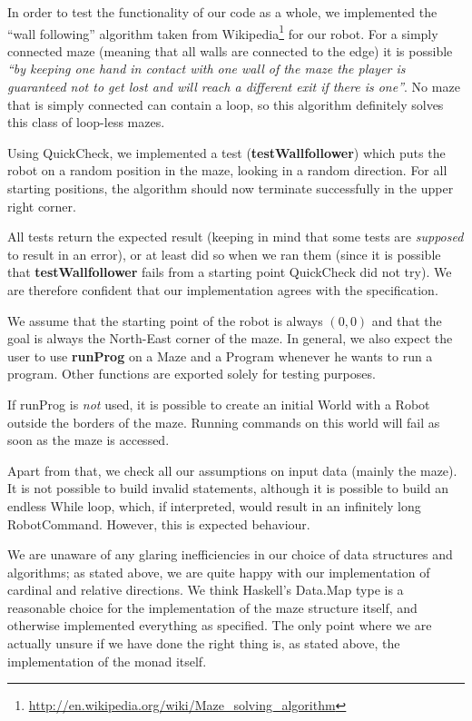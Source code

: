 \documentclass[a4paper]{article}
\begin{document}
In order to test the functionality of our code as a whole, we implemented the ``wall following'' algorithm taken from
Wikipedia\footnote{\url{http://en.wikipedia.org/wiki/Maze_solving_algorithm}} for our robot.
For a simply connected maze (meaning that all walls are
connected to the edge) it is possible \emph{``by keeping one hand in
  contact with one wall of the maze the player is guaranteed not to
  get lost and will reach a different exit if there is one''}. No maze
that is simply connected can contain a loop, so this algorithm
definitely solves this class of loop-less mazes. 

Using QuickCheck, we implemented a test (\textbf{testWallfollower}) which puts the robot on a random position in the maze, looking in a random direction. For all starting positions, the algorithm should now terminate successfully in the upper right corner. 

All tests return the expected result (keeping in mind that some tests are \emph{supposed} to result in an error), or at least did so when we ran them (since it is possible that \textbf{testWallfollower} fails from a starting point QuickCheck did not try). We are therefore confident that our implementation agrees with the specification.

We assume that the starting point of the robot is always $(0,0)$ and that the goal is always the North-East corner of the maze. In general, we also expect the user to use \textbf{runProg} on a Maze and a Program whenever he wants to run a program. Other functions are exported solely for testing purposes. 

If runProg is \emph{not} used, it is possible to create an initial World with a Robot outside the borders of the maze. Running commands on this world will fail as soon as the maze is accessed.

Apart from that, we check all our assumptions on input data (mainly the maze). It is not possible to build invalid statements, although it is possible to build an endless While loop, which, if interpreted, would result in an infinitely long RobotCommand. However, this is expected behaviour.

We are unaware of any glaring inefficiencies in our choice of data structures and algorithms; as stated above, we are quite happy with our implementation of cardinal and relative directions. We think Haskell's Data.Map type is a reasonable choice for the implementation of the maze structure itself, and otherwise implemented everything as specified. The only point where we are actually unsure if we have done the right thing is, as stated above, the implementation of the monad itself. 
\end{document}
